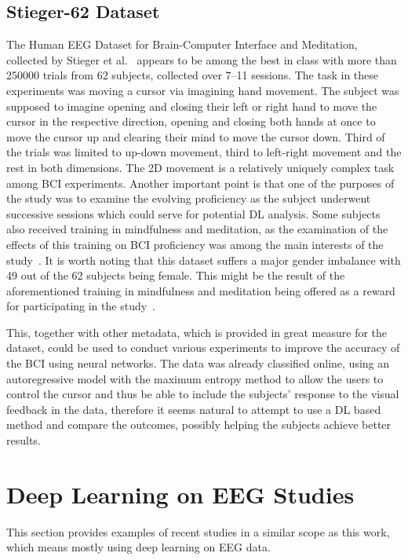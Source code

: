 \documentclass[english, he, bc, kiv, iso690alph, viewonly]{fasthesis}
\begin{document}
\subsection{Stieger-62 Dataset}
\label{subsec:stieger-62}

The Human EEG Dataset for Brain-Computer Interface and Meditation, collected by Stieger et al.~\cite{data:stieger:21} appears to be among the best in class with more than 250000 trials from 62 subjects, collected over 7--11 sessions.
The task in these experiments was moving a cursor via imagining hand movement. The subject was supposed to imagine opening and closing their left or right hand to move the cursor in the respective direction, opening and closing both hands at once to move the cursor up and clearing their mind to move the cursor down. Third of the trials was limited to up-down movement, third to left-right movement and the rest in both dimensions.
The 2D movement is a relatively uniquely complex task among BCI experiments.
Another important point is that one of the purposes of the study was to examine the evolving proficiency as the subject underwent successive sessions which could serve for potential DL analysis.
Some subjects also received training in mindfulness and meditation, as the examination of the effects of this training on BCI proficiency was among the main interests of the study~\cite{stieger:mindfulness:20}. It is worth noting that this dataset suffers a major gender imbalance with 49 out of the 62 subjects being female. This might be the result of the aforementioned training in mindfulness and meditation being offered as a reward for participating in the study~\cite{data:stieger:21}.

This, together with other metadata, which is provided in great measure for the dataset, could be used to conduct various experiments to improve the accuracy of the BCI using neural networks.
The data was already classified online, using an autoregressive model with the maximum entropy method to allow the users to control the cursor and thus be able to include the subjects' response to the visual feedback in the data, therefore it seems natural to attempt to use a DL based method and compare the outcomes, possibly helping the subjects achieve better results.

\section{Deep Learning on EEG Studies}

This section provides examples of recent studies in a similar scope as this work, which means mostly using deep learning on EEG data.
\end{document}
